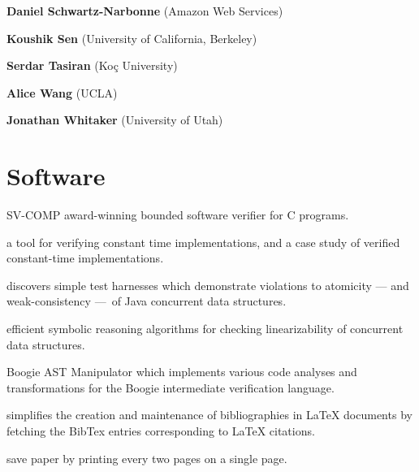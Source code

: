 \documentclass{article}
\begin{document}
\begin{commalist}
    \item {\bf Daniel Schwartz-Narbonne} (Amazon Web Services)


    \item {\bf Koushik Sen} (University of California, Berkeley)


    \item {\bf Serdar Tasiran} (Koç University)


    \item {\bf Alice Wang} (UCLA)


    \item {\bf Jonathan Whitaker} (University of Utah)

  \end{commalist}

  \section*{Software}

  \begin{description}[leftmargin=0cm]

    \item[\href{%
    https://github.com/smackers/smack}{%
    SMACK},] SV-COMP award-winning bounded software verifier for C programs.



    \item[\href{%
    https://github.com/imdea-software/verifying-constant-time}{%
    ct-verif},] a tool for verifying constant time implementations, and a case study of verified constant-time implementations.



    \item[\href{%
    https://github.com/michael-emmi/violat}{%
    Violat},] discovers simple test harnesses which demonstrate violations to atomicity — and weak-consistency — of Java concurrent data structures.



    \item[\href{%
    https://github.com/imdea-software/violin}{%
    Violin},] efficient symbolic reasoning algorithms for checking linearizability of concurrent data structures.



    \item[\href{%
    https://github.com/michael-emmi/bam-bam-boogieman}{%
    BAM! BAM! Boogieman},] Boogie AST Manipulator which implements various code analyses and transformations for the Boogie intermediate verification language.



    \item[\href{%
    https://github.com/michael-emmi/bibly}{%
    Bibly},] simplifies the creation and maintenance of bibliographies in LaTeX documents by fetching the BibTex entries corresponding to LaTeX citations.



    \item[\href{%
    https://github.com/michael-emmi/2up}{%
    2up},] save paper by printing every two pages on a single page.


  \end{description}
\end{document}
